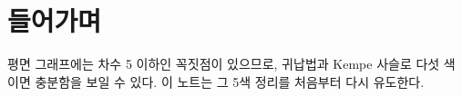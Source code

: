 \section{들어가며}\label{sec:intro}
평면 그래프에는 차수 5 이하인 꼭짓점이 있으므로, 귀납법과 Kempe 사슬로 다섯 색이면 충분함을 보일 수 있다.
이 노트는 그 5색 정리를 처음부터 다시 유도한다.
